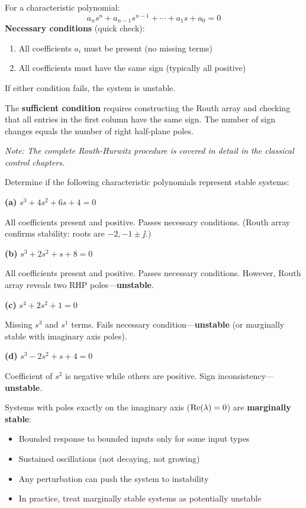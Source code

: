 \begin{keyconceptbox}[title=Routh-Hurwitz Stability Criterion]
For a characteristic polynomial:
\begin{equation}
a_n s^n + a_{n-1}s^{n-1} + \cdots + a_1 s + a_0 = 0
\end{equation}
\textbf{Necessary conditions} (quick check):
\begin{enumerate}
    \item All coefficients $a_i$ must be present (no missing terms)
    \item All coefficients must have the same sign (typically all positive)
\end{enumerate}
If either condition fails, the system is unstable.

The \textbf{sufficient condition} requires constructing the Routh array and checking that all entries in the first column have the same sign. The number of sign changes equals the number of right half-plane poles.

\textit{Note: The complete Routh-Hurwitz procedure is covered in detail in the classical control chapters.}
\end{keyconceptbox}

\begin{examplebox}[title=Example: Quick Stability Check]
Determine if the following characteristic polynomials represent stable systems:

\textbf{(a)} $s^3 + 4s^2 + 6s + 4 = 0$

All coefficients present and positive. Passes necessary conditions. (Routh array confirms stability: roots are $-2, -1\pm\jj$.)

\textbf{(b)} $s^3 + 2s^2 + s + 8 = 0$

All coefficients present and positive. Passes necessary conditions. However, Routh array reveals two RHP poles---\textbf{unstable}.

\textbf{(c)} $s^4 + 2s^2 + 1 = 0$

Missing $s^3$ and $s^1$ terms. Fails necessary condition---\textbf{unstable} (or marginally stable with imaginary axis poles).

\textbf{(d)} $s^3 - 2s^2 + s + 4 = 0$

Coefficient of $s^2$ is negative while others are positive. Sign inconsistency---\textbf{unstable}.
\end{examplebox}

\begin{warningbox}[title=Marginal Stability Warning]
Systems with poles exactly on the imaginary axis ($\operatorname{Re}(\lambda) = 0$) are \textbf{marginally stable}:
\begin{itemize}
    \item Bounded response to bounded inputs only for some input types
    \item Sustained oscillations (not decaying, not growing)
    \item Any perturbation can push the system to instability
    \item In practice, treat marginally stable systems as potentially unstable
\end{itemize}
\end{warningbox}

